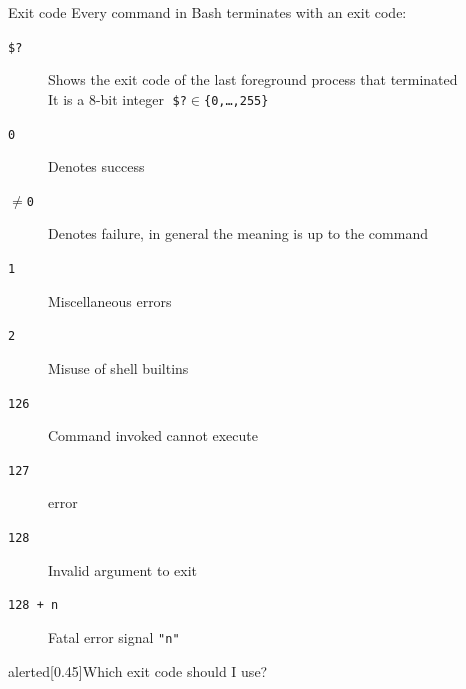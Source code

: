 
\begin{frame}{Exit code}
    \vspace{-1mm}
    Every command in Bash terminates with an exit code:
    \begin{description}
        \item[\texttt{\$?}]
            Shows the exit code of the last foreground process that terminated\\
            It is a 8-bit integer $\;$\texttt{\$?}${}\in{}$\texttt{\{0,\dots,255\}} \hfill{}
        \item[\texttt{0}] Denotes success
        \item[$\neq$\texttt{0}] Denotes failure, in general the meaning is up to the command
        \item[\texttt{1}] Miscellaneous errors
        \item[\texttt{2}] Misuse of shell builtins
        \item[\texttt{126}] Command invoked cannot execute
        \item[\texttt{127}]  error
        \item[\texttt{128}] Invalid argument to exit
        \item[\texttt{128 + n}] Fatal error signal \texttt{"n"} 
    \end{description}
    \begin{varblock}{alerted}[0.45\textwidth]{Which exit code should I use?}
    \end{varblock}
\end{frame}
